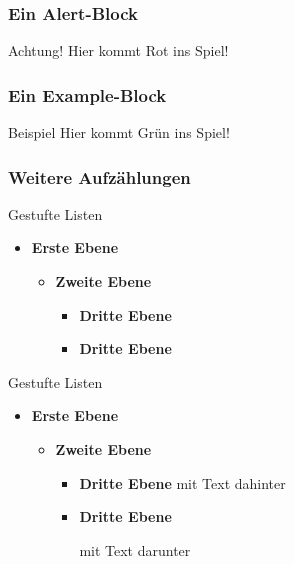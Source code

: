 \documentclass[german, ngerman]{beamer}
\begin{document}
\begin{frame}
	\frametitle{Ein Alert-Block}

	\begin{alertblock}{Achtung!}
		Hier kommt Rot ins Spiel!
	\end{alertblock}
\end{frame}

\begin{frame}
	\frametitle{Ein Example-Block}

	\begin{exampleblock}{Beispiel}
		Hier kommt Grün ins Spiel!
	\end{exampleblock}
\end{frame}

\begin{frame}
	\frametitle{Weitere Aufzählungen}

	Gestufte Listen
	\begin{itemize}
		\item \textbf{Erste Ebene}
		\begin{itemize}
			\item \textbf{Zweite Ebene}
			\begin{itemize}
				\item \textbf{Dritte Ebene}
				\item \textbf{Dritte Ebene}
			\end{itemize}
		\end{itemize}
	\end{itemize}
	Gestufte Listen
	\begin{itemize}
		\item \textbf{Erste Ebene}
		\begin{itemize}
			\item \textbf{Zweite Ebene}
			\begin{itemize}
				\item \textbf{Dritte Ebene} mit Text dahinter
				\item \textbf{Dritte Ebene}
				
				mit Text darunter
			\end{itemize}
		\end{itemize}
	\end{itemize}
\end{frame}
\end{document}
